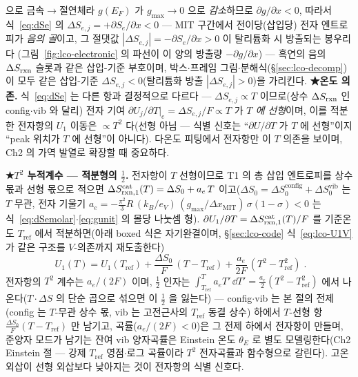 으로 금속$\to$절연체라 $g(E_F)$ 가 $g_{\max}\!\to\!0$ 으로 \emph{감소}하므로 $\partial g/\partial x<0$, 따라서
식~\eqref{eq:dSe} 의 $\Delta S_{e,j}=+\partial S_e/\partial x<0$ --- MIT 구간에서 전이당(삽입당) 전자 엔트로피가
\emph{음의 골}이고, 그 절댓값 $|\Delta S_{e,j}|=-\partial S_e/\partial x>0$ 이 탈리튬화 시 방출되는 봉우리다
(그림~\ref{fig:lco-electronic} 의 파선이 이 양의 방출량 $-\partial g/\partial x$) --- 흑연의 음의 $\Delta S_{\mathrm{rxn}}$
슬롯과 같은 삽입-기준 부호이며, 박스$\cdot$프레임 그림$\cdot$분해식(\S\ref{sec:lco-decomp})이 모두 같은
삽입-기준 $\Delta S_{e,j}<0$(탈리튬화 방출 $|\Delta S_{e,j}|>0$)을 가리킨다. \textbf{★온도 의존.} 식~\eqref{eq:dSe} 는 다른 항과 결정적으로 다르다 --- $\Delta S_{e,j}\propto T$ 이므로(상수 $\Delta S_{\mathrm{rxn}}$ 인
config$\cdot$vib 와 달리) 전자 기여 $\partial U_j/\partial T|_e=\Delta S_{e,j}/F\propto T$ 가 \emph{$T$ 에 선형}이며,
이를 적분한 전자항의 $U_1$ 이동은 $\propto T^2$ 다(선형 아님 --- 식별 신호는 ``$\partial U/\partial T$ 가 $T$ 에
선형''이지 ``peak 위치가 $T$ 에 선형''이 아니다). 다온도 피팅에서 전자항만 이 $T$ 의존을 보이며, Ch2 의 가역
발열로 확장할 때 중요하다.

\textbf{★$T^2$ 누적계수 --- 적분형의 $\tfrac12$.} 전자항이 $T$ 선형이므로 T1 의 총 삽입 엔트로피를 상수 몫과 선형 몫으로 적으면
$\Delta S_{\mathrm{rxn},1}^\mathrm{cat}(T)=\Delta S_0+a_e\,T$ 이고($\Delta S_0=\Delta S_0^\mathrm{config}+
\Delta S_0^\mathrm{vib}$ 는 $T$ 무관, 전자 기울기 $a_e=-\tfrac{\pi^2}{3}R\,(k_B/e_V)\,(g_{\max}/
\Delta x_\mathrm{MIT})\,\sigma(1-\sigma)<0$ 는 식~\eqref{eq:dSemolar}$\cdot$\eqref{eq:gunit} 의 몰당 나눗셈 형).
$\partial U_1/\partial T=\Delta S_{\mathrm{rxn},1}^\mathrm{cat}(T)/F$ 를 기준온도 $T_\mathrm{ref}$ 에서 적분하면(아래 boxed 식은 자기완결이며, \S\ref{sec:lco-code} 식~\eqref{eq:lco-U1V} 가 같은 구조를 $V$-의존까지 재도출한다)
\begin{equation}
\boxed{\;U_1(T)=U_1(T_\mathrm{ref})+\frac{\Delta S_0}{F}\,(T-T_\mathrm{ref})+\frac{a_e}{2F}\,(T^2-T_\mathrm{ref}^2)\;.}
\label{eq:U1T2}
\end{equation}
전자항의 $T^2$ 계수는 $a_e/(2F)$ 이며, $\tfrac12$ 인자는 $\int_{T_\mathrm{ref}}^{T}a_e T'\,\dd T'=\tfrac{a_e}{2}
(T^2-T_\mathrm{ref}^2)$ 에서 나온다($T\cdot\Delta S$ 의 단순 곱으로 섞으면 이 $\tfrac12$ 을 잃는다) --- config$\cdot$vib 는
본 절의 전제(config 는 $T$-무관 상수 몫, vib 는 고전근사의 $T_\mathrm{ref}$ 동결 상수) 하에서
$T$-선형 항 $\tfrac{\Delta S_0}{F}(T-T_\mathrm{ref})$ 만 남기고, 곡률($a_e/(2F)<0$)은 그 전제 하에서
전자항이 만들며, 준양자 모드가 남기는 잔여 vib 양자곡률은 Einstein 온도 $\theta_E$ 로 별도
모델링한다(Ch2 Einstein 절 --- 강제 $T_\mathrm{ref}$ 영점$\cdot$로그 곡률이라 $T^2$ 전자곡률과 함수형으로
갈린다). 고온 외삽이 선형 외삽보다 낮아지는 것이 전자항의 식별 신호다.

